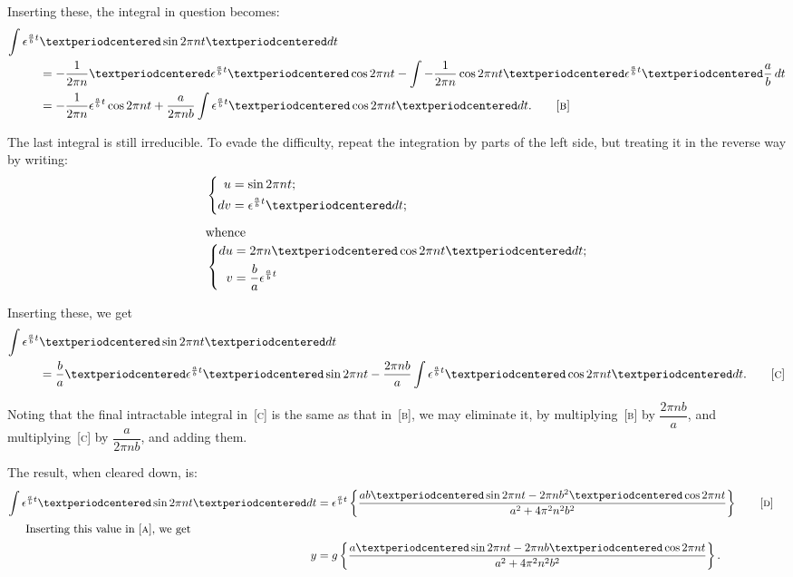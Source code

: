 \documentclass[12pt]{book}[2005/09/16]
\newcommand{\DPPageSep}[2]{\Pagelabel{#2}}
\newcommand{\Pagelabel}[1]
  {\phantomsection\label{#1}}
\newcommand{\efrac}[2]{\frac{#1}{#2}}
\begin{document}
Inserting these, the integral in question becomes:
\begin{align*}
\int \epsilon^{\efrac{a}{b} t} &{} · \sin 2 \pi n t · dt \\
&= -\frac{1}{2 \pi n} · \epsilon^{\efrac{a}{b} t} · \cos 2 \pi nt
   -\int -\frac{1}{2\pi n} \cos 2 \pi nt · \epsilon^{\efrac{a}{b} t} · \frac{a}{b}\, dt \\
&= -\frac{1}{2 \pi n} \epsilon^{\efrac{a}{b} t} \cos 2 \pi nt
   +\frac{a}{2 \pi nb} \int \epsilon^{\efrac{a}{b} t} · \cos 2 \pi nt · dt.
\tag*{[\textsc{b}]}
\end{align*}

The last integral is still irreducible. To evade the
difficulty, repeat the integration by parts of the left
side, but treating it in the reverse way by writing:
\begin{align*}
&\left\{
\begin{aligned}
u &= \sin 2 \pi n t ; \\
dv &= \epsilon^{\efrac{a}{b} t} · dt;
\end{aligned}
\right. \\[1ex]
\intertext{whence}
&\left\{
  \begin{aligned}
  du &= 2 \pi n · \cos 2 \pi n t · dt; \\
 v &= \frac{b}{a} \epsilon ^{\efrac{a}{b} t}
\end{aligned}
\right.
\end{align*}

Inserting these, we get
\begin{align*}
\int \epsilon^{\efrac{a}{b} t} &{} · \sin 2 \pi n t · dt\\
&= \frac{b}{a} · \epsilon^{\efrac{a}{b} t} · \sin 2 \pi n t -
   \frac{2 \pi n b}{a} \int \epsilon^{\efrac{a}{b} t} · \cos 2 \pi n t · dt. \tag*{[\textsc{c}]}
\end{align*}

Noting that the final intractable integral in~[\textsc{c}] is
the same as that in~[\textsc{b}], we may eliminate it, by
multiplying~[\textsc{b}] by $\dfrac{2 \pi nb}{a}$, and multiplying~[\textsc{c}] by
$\dfrac{a}{2 \pi nb}$, and adding them.
\DPPageSep{253.png}{241}%

The result, when cleared down, is:
\begin{align*}
\int \epsilon^{\efrac{a}{b} t} · \sin 2 \pi n t · dt
  &= \epsilon^{\efrac{a}{b} t} \left\{\frac{ ab · \sin 2 \pi nt - 2 \pi n b^2 · \cos 2 \pi n t}{ a^2 + 4 \pi^2 n^2 b^2 } \right\}
\tag*{[\textsc{d}]} &\\
\intertext{\indent Inserting this value in~[\textsc{a}], we get}
y &= g \left\{\frac{ a · \sin 2 \pi n t - 2 \pi n b · \cos 2 \pi nt}{ a^2 + 4 \pi^2  n^2 b^2}\right\}. &
\end{align*}
\end{document}
